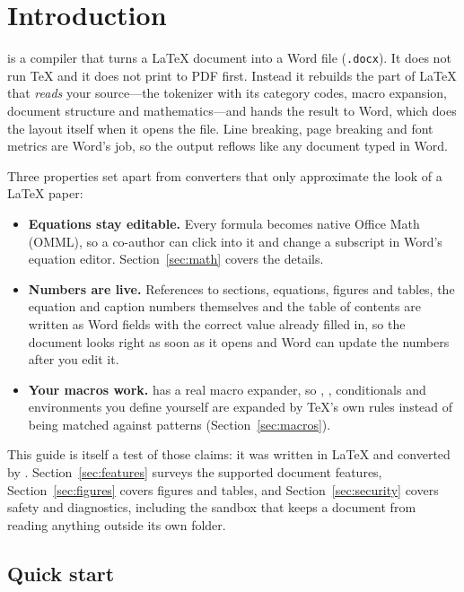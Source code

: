 \section{Introduction}\label{sec:intro}

\texdocx{} is a compiler that turns a \LaTeX{} document into a Word file
(\texttt{.docx}). It does not run \TeX{} and it does not print to PDF first.
Instead it rebuilds the part of \LaTeX{} that \emph{reads} your source---the
tokenizer with its category codes, macro expansion, document structure and
mathematics---and hands the result to Word, which does the layout itself when
it opens the file. Line breaking, page breaking and font metrics are Word's job,
so the output reflows like any document typed in Word.

Three properties set \texdocx{} apart from converters that only approximate the
look of a \LaTeX{} paper:
\begin{itemize}
  \item \textbf{Equations stay editable.} Every formula becomes native Office
        Math (OMML), so a co-author can click into it and change a subscript in
        Word's equation editor. Section~\ref{sec:math} covers the details.
  \item \textbf{Numbers are live.} References to sections, equations,
        figures and tables, the equation and caption numbers themselves and
        the table of contents are written as Word fields with the correct value
        already filled in, so the document looks right as soon as it opens and
        Word can update the numbers after you edit it.
  \item \textbf{Your macros work.} \texdocx{} has a real macro expander, so
        , , conditionals and environments you define
        yourself are expanded by \TeX's own rules instead of being
        matched against patterns (Section~\ref{sec:macros}).
\end{itemize}

This guide is itself a test of those claims: it was written in \LaTeX{} and
converted by \texdocx{}. Section~\ref{sec:features} surveys the supported
document features, Section~\ref{sec:figures} covers figures and tables, and
Section~\ref{sec:security} covers safety and diagnostics, including the sandbox
that keeps a document from reading anything outside its own folder.

\subsection{Quick start}

